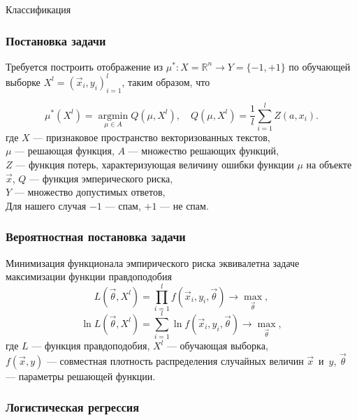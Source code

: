 \documentclass[compress,professionalfont]{beamer}
\begin{document}
\begin{frame}

\begin{center}
Классификация
\end{center}

\end{frame}

\begin{frame}
\frametitle{Постановка задачи}

Требуется построить отображение из $\mu^{*} : X =  \mathbb{R}^n \rightarrow Y = \{-1,+1\}$ по обучающей выборке $X^l = (\vec{x}_i, y_i)_{i=1}^l$, таким образом, что

$$
\mu^{*}\left(X^l\right) = \operatorname*{argmin}_{\mu \in A}  Q\left(\mu, X^l\right), \quad Q\left(\mu, X^l\right) = \dfrac{1}{l} \sum_{i=1}^{l} Z(a, x_i).
$$
где $X$ --- признаковое пространство векторизованных текстов, \\
$\mu$ --- решающая функция, $A$ --- множество решающих функций, \\
$Z$ --- функция потерь, характеризующая величину ошибки функции $\mu$ на объекте $\vec{x}$, $Q$ --- функция эмперического риска, \\
$Y$ --- множество допустимых ответов, \\
Для нашего случая $-1$ --- спам, $+1$ --- не спам. \\

\end{frame}

\begin{frame}
\frametitle{Вероятностная постановка задачи}

Минимизация функционала эмпирического риска эквивалетна задаче максимизации функции правдоподобия
$$
L(\vec{\theta}, X^l) = \prod\limits_{i=1}^l f(\vec{x}_i, y_i, \vec{\theta}) \rightarrow \max_{\vec{\theta}},
$$
$$
\ln L(\vec{\theta}, X^l) = \sum_{i=1}^{l} \ln f(\vec{x}_i, y_i, \vec{\theta}) \rightarrow \max_{\vec{\theta}},
$$
где $L$ --- функция правдоподобия, $X^l$ --- обучающая выборка, \\
$f(\vec{x}, y)$ --- совместная плотность распределения случайных величин $\vec{x}$~и~$y$,
$\vec{\theta}$ --- параметры решающей функции.

\end{frame}

\begin{frame}
\frametitle{Логистическая регрессия}


\end{frame}
\end{document}
